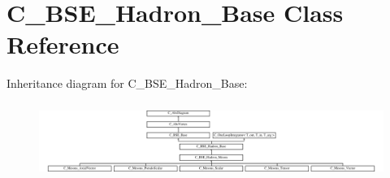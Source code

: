 \hypertarget{class_c___b_s_e___hadron___base}{\section{C\-\_\-\-B\-S\-E\-\_\-\-Hadron\-\_\-\-Base Class Reference}
\label{class_c___b_s_e___hadron___base}
}
Inheritance diagram for C\-\_\-\-B\-S\-E\-\_\-\-Hadron\-\_\-\-Base\-:\begin{figure}[H]
\begin{center}
\leavevmode
\includegraphics[height=2.470588cm]{class_c___b_s_e___hadron___base}
\end{center}
\end{figure}

